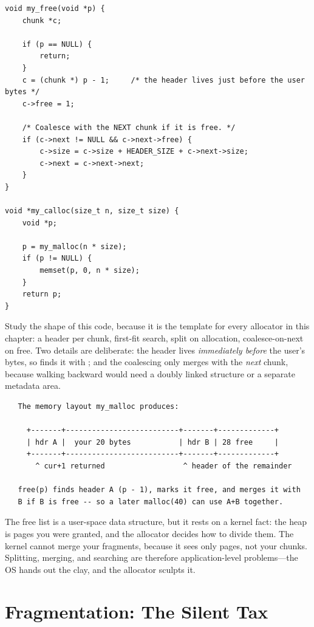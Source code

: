 \begin{lstlisting}[caption={A minimal free-list allocator, on a static arena.}]
void my_free(void *p) {
    chunk *c;

    if (p == NULL) {
        return;
    }
    c = (chunk *) p - 1;     /* the header lives just before the user bytes */
    c->free = 1;

    /* Coalesce with the NEXT chunk if it is free. */
    if (c->next != NULL && c->next->free) {
        c->size = c->size + HEADER_SIZE + c->next->size;
        c->next = c->next->next;
    }
}

void *my_calloc(size_t n, size_t size) {
    void *p;

    p = my_malloc(n * size);
    if (p != NULL) {
        memset(p, 0, n * size);
    }
    return p;
}
\end{lstlisting}

Study the shape of this code, because it is the template for every
allocator in this chapter: a header per chunk, first-fit search,
split on allocation, coalesce-on-next on free. Two details are
deliberate: the header lives \emph{immediately before} the user's
bytes, so  finds it with ; and
the coalescing only merges with the \emph{next} chunk, because walking
backward would need a doubly linked structure or a separate metadata
area.

\begin{verbatim}
   The memory layout my_malloc produces:

     +-------+--------------------------+-------+-------------+
     | hdr A |  your 20 bytes           | hdr B | 28 free     |
     +-------+--------------------------+-------+-------------+
       ^ cur+1 returned                  ^ header of the remainder

   free(p) finds header A (p - 1), marks it free, and merges it with
   B if B is free -- so a later malloc(40) can use A+B together.
\end{verbatim}

\begin{osconcept}
The free list is a user-space data structure, but it rests on a kernel
fact: the heap is pages you were granted, and the allocator decides
how to divide them. The kernel cannot merge your fragments, because it
sees only pages, not your chunks. Splitting, merging, and searching
are therefore application-level problems---the OS hands out the clay,
and the allocator sculpts it.
\end{osconcept}

\section{Fragmentation: The Silent Tax}


